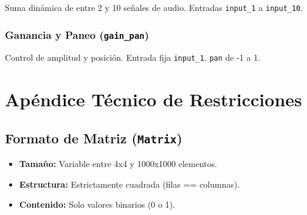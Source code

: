 Suma dinámica de entre 2 y 10 señales de audio. Entradas \texttt{input\_1} a \texttt{input\_10}.

\subsubsection{Ganancia y Paneo (\texttt{gain\_pan})}

Control de amplitud y posición. Entrada fija \texttt{input\_1}. \texttt{pan} de -1 a 1.

\section{Apéndice Técnico de Restricciones}

\subsection{Formato de Matriz (\texttt{Matrix})}

\begin{itemize}
    \item \textbf{Tamaño:} Variable entre 4x4 y 1000x1000 elementos.
    \item \textbf{Estructura:} Estrictamente cuadrada (filas == columnas).
    \item \textbf{Contenido:} Solo valores binarios (0 o 1).
\end{itemize}
